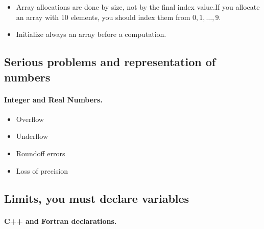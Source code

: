 \documentclass[%
oneside,                 %
final,                   %
10pt]{article}
\begin{document}
{\begin{itemize}
  \item Array allocations are done by size, not by the final index value.If you allocate an array with 10 elements, you should index them from $0,1,\dots, 9$.

  \item Initialize always an array before a computation.
\end{itemize}

\noindent



\subsection{Serious problems and representation of numbers}


\paragraph{Integer and Real Numbers.}

\begin{itemize}
  \item Overflow

  \item Underflow

  \item Roundoff errors

  \item Loss of precision
\end{itemize}

\noindent



\subsection{Limits, you must declare variables}



\paragraph{C++ and Fortran declarations.}


}
\end{document}
